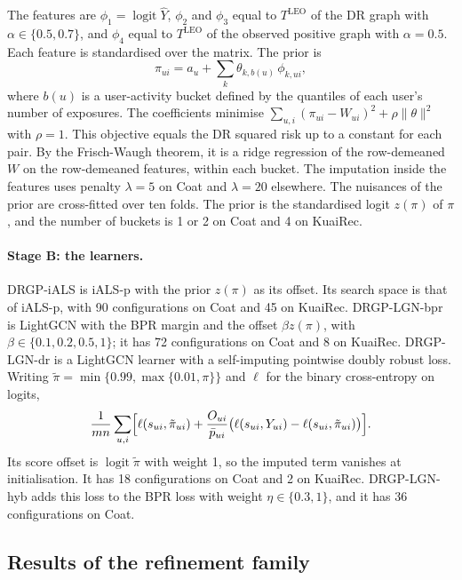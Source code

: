 The features are $\phi_1=\operatorname{logit}\hat Y$, $\phi_2$ and $\phi_3$ equal to $T^{\mathrm{LEO}}$ of the DR
graph with $\alpha\in\{0.5,0.7\}$, and $\phi_4$ equal to $T^{\mathrm{LEO}}$ of the observed positive graph with
$\alpha=0.5$. Each feature is standardised over the matrix. The prior is
\begin{equation*}
\pi_{ui}=a_u+\sum_k\theta_{k,b(u)}\,\phi_{k,ui},
\end{equation*}
where $b(u)$ is a user-activity bucket defined by the quantiles of each user's number of exposures. The
coefficients minimise $\sum_{u,i}(\pi_{ui}-W_{ui})^2+\rho\|\theta\|^2$ with $\rho=1$. This objective equals the
DR squared risk up to a constant for each pair. By the Frisch-Waugh theorem, it is a ridge regression of the
row-demeaned $W$ on the row-demeaned features, within each bucket. The imputation inside the features uses
penalty $\lambda=5$ on Coat and $\lambda=20$ elsewhere. The nuisances of the prior are cross-fitted over
ten folds. The prior is the standardised logit $z(\pi)$ of $\pi$, and the number of buckets is 1 or 2 on Coat
and 4 on KuaiRec.

\paragraph{Stage B: the learners.}
DRGP-iALS is iALS-p with the prior $z(\pi)$ as its offset. Its search space is that of iALS-p, with 90 configurations on
Coat and 45 on KuaiRec. DRGP-LGN-bpr is LightGCN with the BPR margin and the offset $\beta z(\pi)$, with
$\beta\in\{0.1,0.2,0.5,1\}$; it has 72 configurations on Coat and 8 on KuaiRec. DRGP-LGN-dr is a LightGCN learner
with a self-imputing pointwise doubly robust loss. Writing $\tilde\pi=\min\{0.99,\max\{0.01,\pi\}\}$ and
$\ell$ for the binary cross-entropy on logits,
\begin{equation*}
\frac{1}{mn}\sum_{u,i}\Bigl[\ell(s_{ui},\tilde\pi_{ui})+\frac{O_{ui}}{\bar p_{ui}}\bigl(\ell(s_{ui},Y_{ui})-\ell(s_{ui},\tilde\pi_{ui})\bigr)\Bigr].
\end{equation*}
Its score offset is $\operatorname{logit}\tilde\pi$ with weight 1, so the imputed term vanishes at initialisation.
It has 18 configurations on Coat and 2 on KuaiRec. DRGP-LGN-hyb adds this loss to the BPR loss with weight
$\eta\in\{0.3,1\}$, and it has 36 configurations on Coat.

\subsection{Results of the refinement family}\label{sec:refine-results}


